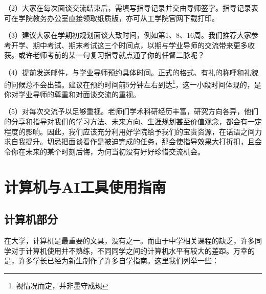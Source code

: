 \documentclass[11pt,oneside]{book}
\begin{document}
\vspace{10pt}

（2）大家在每次面谈交流结束后，需填写指导记录并交由导师签字。指导记录表可在学院教务办公室直接领取纸质版，亦可从工学院官网下载打印。

\vspace{10pt}

（3）建议大家在学期初规划面谈大致时间，例如第1、8、16周。我们推荐大家参考开学、期中考试、期末考试这三个时间点，以期与学业导师的交流带来更多收获。或许老师考前的某一句复习指导就点通了你的任督二脉呢？

\vspace{10pt}

（4）提前发送邮件，与学业导师预约具体时间。正式的格式、有礼的称呼和礼貌的问候总不会出错。建议在预约时间前5分钟左右到达\footnote{视情况而定，并非墨守成规}，这一小段时间体现的，是你对学业导师的尊重和对面谈交流的重视。

\vspace{10pt}

（5）对每次交流予以足够重视。老师们学术科研经历丰富，研究方向各异，他们的分享和指导对我们的学习方法、未来方向、生涯规划甚至价值观念，都会有一定程度的影响。因此，我们应该充分利用好学院给予我们的宝贵资源，在话语之间力求自我提升。切忌把面谈看作是被迫完成的任务，那会使指导效果大打折扣，且会令你在未来的某个时刻后悔，为何当初没有好好珍惜交流机会。

\section{计算机与AI工具使用指南}

\subsection{计算机部分}

在大学，计算机是最重要的文具，没有之一。而由于中学相关课程的缺乏，许多同学对于计算机使用并不熟练，不同同学之间的计算机水平有较大的差距。万幸的是，许多学长已经为新生制作了许多自学指南。这里我们列举一些：
\end{document}
